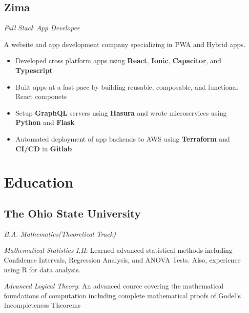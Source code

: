 \documentclass[letterpaper,11pt]{article}
\begin{document}
\subsection{Zima}
\textit{Full Stack App Developer}
\vspace{2mm}
\begin{adjustwidth}{1cm}{1cm}
A website and app development company specializing in PWA and Hybrid apps.

\begin{itemize}
\setlength\itemsep{0em}
\item Developed cross platform apps using \textbf{React}, \textbf{Ionic}, \textbf{Capacitor}, and \textbf{Typescript}
\item Built apps at a fast pace by building reusable, composable, and functional React componets
\item Setup \textbf{GraphQL} servers using \textbf{Hasura} and wrote microservices using \textbf{Python} and \textbf{Flask}
\item Automated deployment of app backends to AWS using \textbf{Terraform} and \textbf{CI/CD} in \textbf{Gitlab}
\end{itemize}

\end{adjustwidth}

\section{Education}
\subsection{The Ohio State University}
\textit{B.A. Mathematics(Theoretical Track)}
\vspace{2mm}
\begin{adjustwidth}{1cm}{1cm}
\textit{Mathematical Statistics I,II}: Learned advanced statistical methods including Confidence Intervals, Regression Analysis, and ANOVA Tests. Also, experience using R for data analysis.

\vspace{2mm}
\textit{Advanced Logical Theory}: An advanced cource covering the mathematical foundations of computation
including complete mathematical proofs of Godel's Incompleteness Theorems
\end{adjustwidth}
\end{document}
